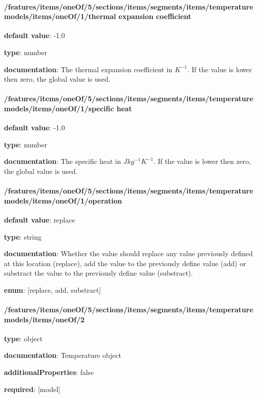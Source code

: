 \begin{itemized}
\end{itemized}\paragraph{/features/items/oneOf/5/sections/items/segments/items/temperature models/items/oneOf/1/thermal expansion coefficient} \begin{itemized}
\item {\bf default value}: -1.0
\item {\bf type}: number
\item {\bf documentation}: The thermal expansion coefficient in $K^{-1}$. If the value is lower then zero, the global value is used.
\end{itemized}\paragraph{/features/items/oneOf/5/sections/items/segments/items/temperature models/items/oneOf/1/specific heat} \begin{itemized}
\item {\bf default value}: -1.0
\item {\bf type}: number
\item {\bf documentation}: The specific heat in $J kg^{-1} K^{-1}$. If the value is lower then zero, the global value is used.
\end{itemized}\paragraph{/features/items/oneOf/5/sections/items/segments/items/temperature models/items/oneOf/1/operation} \begin{itemized}
\item {\bf default value}: replace
\item {\bf type}: string
\item {\bf documentation}: Whether the value should replace any value previously defined at this location (replace), add the value to the previously define value (add) or substract the value to the previously define value (substract).
\item {\bf enum}: [replace, add, substract]\end{itemized}\paragraph{/features/items/oneOf/5/sections/items/segments/items/temperature models/items/oneOf/2} \begin{itemized}
\item {\bf type}: object
\item {\bf documentation}: Temperature object
\item {\bf additionalProperties}: false
\item {\bf required}: [model]\end{itemized}
